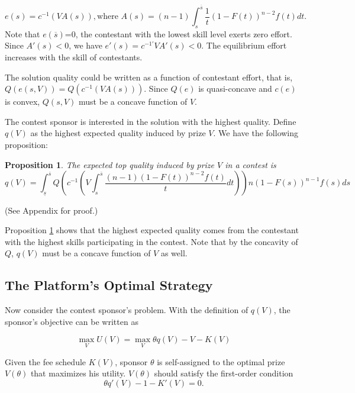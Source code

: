 \documentclass[12pt]{article}
\newtheorem{Proposition}{Proposition}
\begin{document}
\begin{equation}
e(s)=c^{-1}(VA(s)), \text{where } A(s)=(n-1)\int_{s}^{\overline{s}}\frac{1}{t}(1-F(t))^{n-2}f(t)dt.\label{def_A}
\end{equation}
Note that $e(\overline{s})$=0, the contestant with the lowest skill
level exerts zero effort. Since $A'(s)<0$, we have $e'(s)=c^{-1'}VA'(s)<0$.
The equilibrium effort increases with the skill of contestants.

The solution quality could be written as a function of contestant
effort, that is, $Q(e(s,V))=Q(c^{-1}(VA(s)))$. Since $Q(e)$ is quasi-concave
and $c(e)$ is convex, $Q(s,V)$ must be a concave function of $V$.

The contest sponsor is interested in the solution with the highest quality. Define $q(V)$ as the highest expected quality induced by prize $V$. We have the following proposition:

\begin{Proposition}\label{qV}
The expected top quality induced by prize $V$ in a contest is
\[
q(V)=\int_{\underline{s}}^{\overline{s}}Q\left(c^{-1}\left(V\int_{s}^{\overline{s}}\frac{(n-1)(1-F(t))^{n-2}f(t)}{t}dt\right)\right)n\left(1-F(s)\right)^{n-1}f(s)ds
\]
\end{Proposition}
(See Appendix for proof.)

Proposition \ref{qV} shows that the highest expected quality comes from the contestant with the highest skills participating in the contest. Note that by the concavity of $Q$, $q(V)$ must be a concave function of $V$
as well.


\subsection{The Platform's Optimal Strategy}

Now consider the contest sponsor's problem. With the definition of $q(V)$, the sponsor's objective can be written as

\begin{equation}
\max_{V}U(V)=\max_{V}   \theta q(V)-V-K(V)
\end{equation}


Given the fee schedule $K(V)$, sponsor $\theta$ is self-assigned
to the optimal prize $V(\theta)$ that maximizes his utility. $V(\theta)$
should satisfy the first-order condition
\begin{equation}
\theta q'(V)-1-K'(V)=0.\label{prize}
\end{equation}
\end{document}
